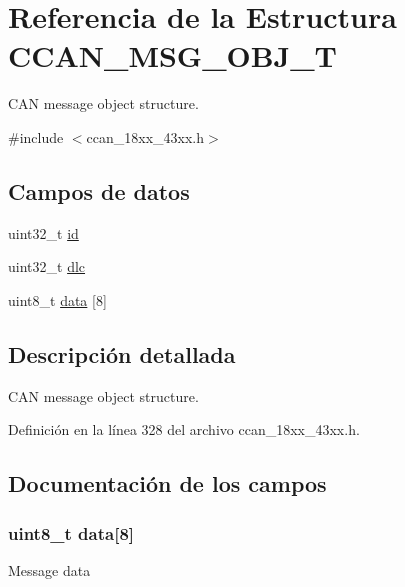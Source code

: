 \hypertarget{struct_c_c_a_n___m_s_g___o_b_j___t}{}\section{Referencia de la Estructura C\+C\+A\+N\+\_\+\+M\+S\+G\+\_\+\+O\+B\+J\+\_\+T}
\label{struct_c_c_a_n___m_s_g___o_b_j___t}


C\+AN message object structure.  




{\ttfamily \#include $<$ccan\+\_\+18xx\+\_\+43xx.\+h$>$}

\subsection*{Campos de datos}
\begin{DoxyCompactItemize}
\item 
uint32\+\_\+t \hyperlink{struct_c_c_a_n___m_s_g___o_b_j___t_abaabdc509cdaba7df9f56c6c76f3ae19}{id}
\item 
uint32\+\_\+t \hyperlink{struct_c_c_a_n___m_s_g___o_b_j___t_a811fbb0cb2c2263b1a7440a7e9d78239}{dlc}
\item 
uint8\+\_\+t \hyperlink{struct_c_c_a_n___m_s_g___o_b_j___t_afb87d045bbf32b236fc425efe02bdc7b}{data} \mbox{[}8\mbox{]}
\end{DoxyCompactItemize}


\subsection{Descripción detallada}
C\+AN message object structure. 

Definición en la línea 328 del archivo ccan\+\_\+18xx\+\_\+43xx.\+h.



\subsection{Documentación de los campos}
\subsubsection[{\texorpdfstring{data}{data}}]{\setlength{\rightskip}{0pt plus 5cm}uint8\+\_\+t data\mbox{[}8\mbox{]}}\hypertarget{struct_c_c_a_n___m_s_g___o_b_j___t_afb87d045bbf32b236fc425efe02bdc7b}{}\label{struct_c_c_a_n___m_s_g___o_b_j___t_afb87d045bbf32b236fc425efe02bdc7b}
Message data 

